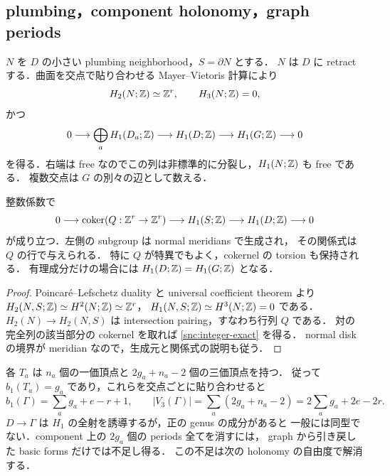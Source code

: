 \subsection{plumbing，component holonomy，graph periods}

$N$ を $D$ の小さい plumbing neighborhood，$S=\partial N$ とする．
$N$ は $D$ に retract する．曲面を交点で貼り合わせる Mayer--Vietoris 計算により
\[
 H_2(N;\mathbb Z)\simeq\mathbb Z^r,\qquad H_3(N;\mathbb Z)=0,
\]
かつ
\begin{equation}\label{snc:divisor-homology}
 0\longrightarrow\bigoplus_aH_1(D_a;\mathbb Z)
 \longrightarrow H_1(D;\mathbb Z)
 \longrightarrow H_1(G;\mathbb Z)\longrightarrow0
\end{equation}
を得る．右端は free なのでこの列は非標準的に分裂し，$H_1(N;\mathbb Z)$ も free である．
複数交点は $G$ の別々の辺として数える．

\begin{proposition}
\label{snc:integer-sequence}
整数係数で
\begin{equation}\label{snc:integer-exact}
 0\longrightarrow\operatorname{coker}(Q:\mathbb Z^r\to\mathbb Z^r)
 \longrightarrow H_1(S;\mathbb Z)
 \longrightarrow H_1(D;\mathbb Z)\longrightarrow0
\end{equation}
が成り立つ．左側の subgroup は normal meridians で生成され，
その関係式は $Q$ の行で与えられる．
特に $Q$ が特異でもよく，cokernel の torsion も保持される．
有理成分だけの場合には $H_1(D;\mathbb Z)=H_1(G;\mathbb Z)$ となる．
\end{proposition}
\begin{proof}
Poincaré--Lefschetz duality と universal coefficient theorem より
$H_2(N,S;\mathbb Z)\simeq H^2(N;\mathbb Z)\simeq\mathbb Z^r$，
$H_1(N,S;\mathbb Z)\simeq H^3(N;\mathbb Z)=0$ である．
$H_2(N)\to H_2(N,S)$ は intersection pairing，すなわち行列 $Q$ である．
対の完全列の該当部分の cokernel を取れば \eqref{snc:integer-exact} を得る．
normal disk の境界が meridian なので，生成元と関係式の説明も従う．
\end{proof}

各 $T_a$ は $n_a$ 個の一価頂点と $2g_a+n_a-2$ 個の三価頂点を持つ．
従って $b_1(T_a)=g_a$ であり，これらを交点ごとに貼り合わせると
\begin{equation}\label{snc:graph-counts}
 b_1(\Gamma)=\sum_a g_a+e-r+1,\qquad
 |V_3(\Gamma)|=\sum_a(2g_a+n_a-2)=2\sum_a g_a+2e-2r.
\end{equation}
$D\to\Gamma$ は $H_1$ の全射を誘導するが，正の genus の成分があると
一般には同型でない．component 上の $2g_a$ 個の periods 全てを消すには，
graph から引き戻した basic forms だけでは不足し得る．
この不足は次の holonomy の自由度で解消する．

